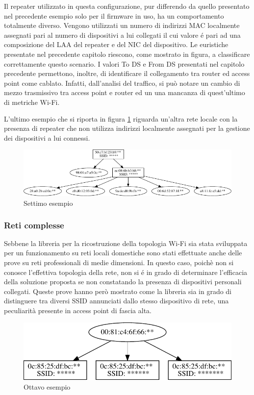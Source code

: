 Il repeater utilizzato in questa configurazione, pur differendo da quello presentato nel precedente esempio solo per il firmware in uso, ha un comportamento totalmente diverso.
Vengono utilizzati un numero di indirizzi MAC localmente assegnati pari al numero di dispositivi a lui collegati il cui valore \'e pari ad una composizione del LAA del repeater e del NIC del dispositivo.
Le euristiche presentate nel precedente capitolo riescono, come mostrato in figura, a classificare correttamente questo scenario.
I valori To DS e From DS presentati nel capitolo precedente permettono, inoltre, di identificare il collegamento tra router ed access point come cablato.
Infatti, dall'analisi del traffico, si pu\`o notare un cambio di mezzo trasmissivo tra access point e router ed un una mancanza di quest'ultimo di metriche Wi-Fi.

L'ultimo esempio che si riporta in figura \ref{fig:es7} riguarda un'altra rete locale con la presenza di repeater che non utilizza indirizzi localmente assegnati per la gestione dei dispositivi a lui connessi.
  
\begin{figure}[!h]
	\centering
	\includegraphics{images/img14censored.pdf}
	\caption{Settimo esempio}
	\label{fig:es7}
\end{figure}

\subsubsection{Reti complesse}
Sebbene la libreria per la ricostruzione della topologia Wi-Fi sia stata sviluppata per un funzionamento su reti locali domestiche sono stati effettuate anche delle prove su reti professionali di medie dimensioni.
In questo caso, poich\`e non si conosce l'effettiva topologia della rete, non si \'e in grado di determinare l'efficacia della soluzione proposta se non constatando la presenza di dispositivi personali collegati.
Queste prove hanno per\`o mostrato come la libreria sia in grado di distinguere tra diversi SSID annunciati dallo stesso dispositivo di rete, una peculiarit\`a presente in access point di fascia alta.


\begin{figure}[!h]
	\centering
	\includegraphics{images/img15censored.pdf}
	\caption{Ottavo esempio}
	\label{fig:es8}
\end{figure}

